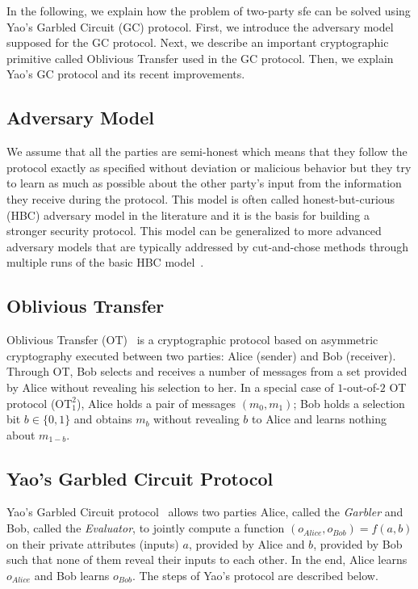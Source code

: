 In the following, we explain how the problem of two-party \acrshort{sfe} can be solved using Yao's Garbled Circuit (GC) protocol.
First, we introduce the adversary model supposed for the GC protocol.
Next, we describe an important cryptographic primitive called Oblivious Transfer used in the GC protocol.
Then, we explain Yao's GC protocol and its recent improvements.

\subsection{Adversary Model}\label{ssec:prelim-adv}
We assume that all the parties are semi-honest which means that they follow the protocol exactly as specified without deviation or malicious behavior but they try to learn as much as possible about the other party's input from the information they receive during the protocol.
This model is often called honest-but-curious (HBC) adversary model in the literature and it is the basis for building a stronger security protocol.
This model can be generalized to more advanced adversary models that are typically addressed by cut-and-chose methods through multiple runs of the basic HBC model~\cite{lindell2007efficient, lindell2012secure}.

\subsection{Oblivious Transfer}\label{ssec:prelim-ot}
Oblivious Transfer (OT)~\cite{naor2005computationally} is a cryptographic protocol based on asymmetric cryptography executed between two parties: Alice (sender) and Bob (receiver).
Through OT, Bob selects and receives a number of messages from a set provided by Alice without revealing his selection to her.
In a special case of $1$-out-of-$2$ OT protocol ($\textrm{OT}^2_1$), Alice holds a pair of messages $(m_{0}, m_{1})$; Bob holds a selection bit $b \in \{0, 1\}$ and obtains $m_{b}$ without revealing $b$ to Alice and learns nothing about $m_{1-b}$.

\subsection{Yao's Garbled Circuit Protocol}\label{ssec:prelim-gc}
Yao's Garbled Circuit protocol~\cite{yao1986generate} allows two parties Alice, called the \textit{Garbler} and Bob, called the \textit{Evaluator}, to jointly compute a function $(o_{Alice}, o_{Bob}) = f(a, b)$ on their private attributes (inputs) $a$, provided by Alice and $b$, provided by Bob such that none of them reveal their inputs to each other.
In the end, Alice learns $o_{Alice}$ and Bob learns $o_{Bob}$.
The steps of Yao's protocol are described below.

